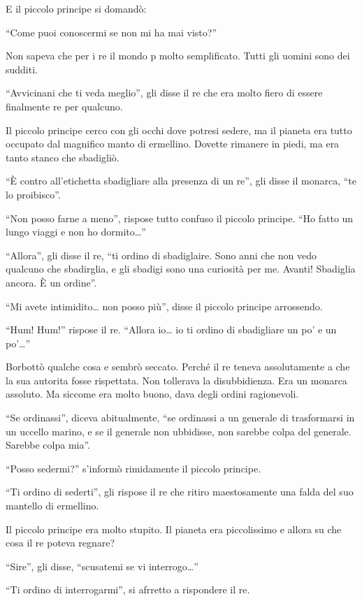 \documentclass[11pt]{scrbook}
\begin{document}
E il piccolo principe si domandò:

``Come puoi conoscermi se non mi ha mai visto?''

Non sapeva che per i re il mondo p molto semplificato. Tutti gli uomini sono dei sudditi.

``Avvicinani che ti veda meglio'', gli disse il re che era molto fiero di essere finalmente re per qualcuno.

Il piccolo principe cerco con gli occhi dove potresi sedere, ma il pianeta era tutto occupato dal magnifico manto di ermellino. Dovette rimanere in piedi, ma era tanto stanco che sbadigliò.

``È contro all'etichetta sbadigliare alla presenza di un re'', gli disse il monarca, ``te lo proibisco''.

``Non posso farne a meno'', rispose tutto confuso il piccolo principe. ``Ho fatto un lungo viaggi e non ho dormito\ldots{}''

``Allora'', gli disse il re, ``ti ordino di sbadiglaire. Sono anni che non vedo qualcuno che sbadirglia, e gli sbadigi sono una curiosità per me. Avanti! Sbadiglia ancora. È un ordine''.

``Mi avete intimidito\ldots{} non posso più'', disse il piccolo principe arrossendo.

``Hum! Hum!'' rispose il re. ``Allora io\ldots{} io ti ordino di sbadigliare un po' e un po'\ldots{}''

Borbottò qualche cosa e sembrò seccato. Perché il re teneva assolutamente a che la sua autorita fosse rispettata. Non tollerava la disubbidienza. Era un monarca assoluto. Ma siccome era molto buono, dava degli ordini ragionevoli.

``Se ordinassi'', diceva abitualmente, ``se ordinassi a un generale di trasformarsi in un uccello marino, e se il generale non ubbidisse, non sarebbe colpa del generale. Sarebbe colpa mia''.

``Posso sedermi?'' s'informò rimidamente il piccolo principe.

``Ti ordino di sederti'', gli rispose il re che ritiro maestosamente una falda del suo mantello di ermellino.

Il piccolo principe era molto stupito. Il pianeta era piccolissimo e allora su che cosa il re poteva regnare?

``Sire'', gli disse, ``scusatemi se vi interrogo\ldots{}''

``Ti ordino di interrogarmi'', si afrretto a rispondere il re.
\end{document}
